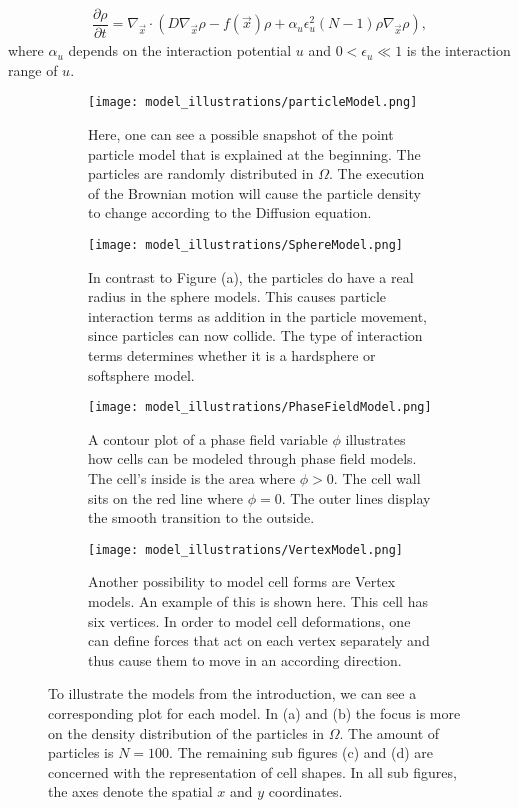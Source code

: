 \documentclass[a4paper,12pt,leqno]{article}
\theoremstyle{plain}
\theoremstyle{remark}
\begin{document}
\begin{align}
	\dfrac{\partial \rho}{\partial t} = \nabla_{\vec{x}} \cdot (D \nabla_{\vec{x}} \rho - f(\vec{x}) \rho + \alpha_u \epsilon_u^2(N-1)\rho \nabla_{\vec{x}} \rho),
\end{align}
where $\alpha_u$ depends on the interaction potential $u$ and $0 < \epsilon_u \ll 1$ is the interaction range of $u$. 
\begin{figure}[t!]
	\centering
	\begin{subfigure}{0.4\textwidth}
		\texttt{[image: model\_illustrations/particleModel.png]}
		\caption{Here, one can see a possible snapshot of the point particle model that is explained at the beginning. The particles are randomly distributed in $\Omega$. The execution of the Brownian motion will cause the particle density to change according to the Diffusion equation.}
	\end{subfigure}
	\hfill
	\begin{subfigure}{0.4\textwidth}
		\texttt{[image: model\_illustrations/SphereModel.png]}
		\caption{In contrast to Figure (a), the particles do have a real radius in the sphere models. This causes particle interaction terms as addition in the particle movement, since particles can now collide. The type of interaction terms determines whether it is a hardsphere or softsphere model.   }
	\end{subfigure}
	\hfill
	\begin{subfigure}{0.4\textwidth}
		\texttt{[image: model\_illustrations/PhaseFieldModel.png]}
		\caption{A contour plot of a phase field variable $\phi$ illustrates how cells can be modeled through phase field models. The cell's inside is the area where $\phi > 0$. The cell wall sits on the red line where $\phi = 0$. The outer lines display the smooth transition to the outside. }
	\end{subfigure}\hfill
	\begin{subfigure}{0.4\textwidth}
		\texttt{[image: model\_illustrations/VertexModel.png]}
		\caption{Another possibility to model cell forms are Vertex models. An example of this is shown here. This cell has six vertices. In order to model cell deformations, one can define forces that act on each vertex separately and thus cause them to move in an according direction. }
	\end{subfigure}
	\caption{ To illustrate the models from the introduction, we can see a corresponding plot for each model. In (a) and (b) the focus is more on the density distribution of the particles in $\Omega$. The amount of particles is $N = 100$. The remaining sub figures (c) and (d) are concerned with the representation of cell shapes. In all sub figures, the axes denote the spatial $x$ and $y$ coordinates. } 
	\label{fig:model_illus}
\end{figure}
\end{document}
